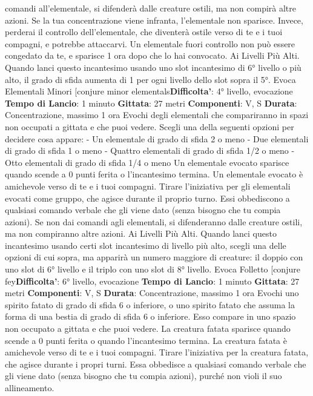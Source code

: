 \begin{multicols}{2}
comandi all’elementale, si difenderà dalle creature ostili,
ma non compirà altre azioni.
Se la tua concentrazione viene infranta, l’elementale
non sparisce. Invece, perderai il controllo
dell’elementale, che diventerà ostile verso di te e i tuoi
compagni, e potrebbe attaccarvi. Un elementale fuori
controllo non può essere congedato da te, e sparisce 1
ora dopo che lo hai convocato.
Ai Livelli Più Alti. Quando lanci questo incantesimo
usando uno slot incantesimo di 6° livello o più alto, il
grado di sfida aumenta di 1 per ogni livello dello slot
sopra il 5°.
Evoca Elementali Minori
[conjure minor elementals\textbf{Difficolta'}:
4° livello, evocazione
\textbf{Tempo di Lancio}: 1 minuto
\textbf{Gittata}: 27 metri
\textbf{Componenti}: V, S
\textbf{Durata}: Concentrazione, massimo 1 ora
Evochi degli elementali che compariranno in spazi non
occupati a gittata e che puoi vedere. Scegli una della
seguenti opzioni per decidere cosa appare:
- Un elementale di grado di sfida 2 o meno
- Due elementali di grado di sfida 1 o meno
- Quattro elementali di grado di sfida 1/2 o meno
- Otto elementali di grado di sfida 1/4 o meno
Un elementale evocato sparisce quando scende a 0
punti ferita o l’incantesimo termina.
Un elementale evocato è amichevole verso di te e i tuoi
compagni. Tirare l’iniziativa per gli elementali evocati
come gruppo, che agisce durante il proprio turno. Essi
obbediscono a qualsiasi comando verbale che gli viene
dato (senza bisogno che tu compia azioni). Se non dai
comandi agli elementali, si difenderanno dalle creature
ostili, ma non compiranno altre azioni.
Ai Livelli Più Alti. Quando lanci questo incantesimo
usando certi slot incantesimo di livello più alto, scegli
una delle opzioni di cui sopra, ma apparirà un numero
maggiore di creature: il doppio con uno slot di 6° livello
e il triplo con uno slot di 8° livello.
Evoca Folletto
[conjure fey\textbf{Difficolta'}:
6° livello, evocazione
\textbf{Tempo di Lancio}: 1 minuto
\textbf{Gittata}: 27 metri
\textbf{Componenti}: V, S
\textbf{Durata}: Concentrazione, massimo 1 ora
Evochi uno spirito fatato di grado di sfida 6 o inferiore, o
uno spirito fatato che assuma la forma di una bestia di
grado di sfida 6 o inferiore. Esso compare in uno spazio
non occupato a gittata e che puoi vedere. La creatura
fatata sparisce quando scende a 0 punti ferita o quando
l’incantesimo termina.
La creatura fatata è amichevole verso di te e i tuoi
compagni. Tirare l’iniziativa per la creatura fatata, che
agisce durante i propri turni. Essa obbedisce a qualsiasi
comando verbale che gli viene dato (senza bisogno che
tu compia azioni), purché non violi il suo allineamento.

\end{multicols}
